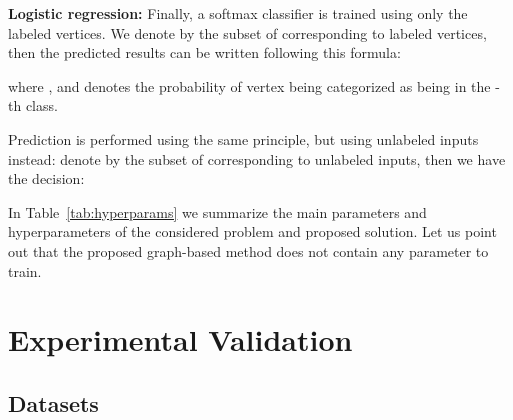 \documentclass[a4paper,conference]{IEEEtran}
\begin{document}
\textbf{Logistic regression:} Finally, a softmax classifier is trained using only the labeled vertices. We denote by  the subset of  corresponding to labeled vertices, then the predicted results  can be written following this formula:

where ,  and  denotes the probability of vertex  being categorized as being in the -th class. 

Prediction is performed using the same principle, but using unlabeled inputs instead: denote by  the subset of  corresponding to unlabeled inputs, then we have the decision:


In Table~\ref{tab:hyperparams} we summarize the main parameters and hyperparameters of the considered problem and proposed solution. Let us point out that the proposed graph-based method does not contain any parameter to train.

\begin{table}[h]
    \caption{Parameters and hyperparameters of the considered problem and proposed solution (\# stands for ``number'').}
    \centering
    \label{tab:hyperparams}
\end{table}

\section{Experimental Validation}
\label{sec:exp}
\subsection{Datasets}
\end{document}

